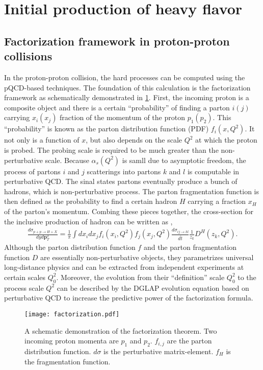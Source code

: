 \section{Initial production of heavy flavor}
\label{section:hard}
\subsection{Factorization framework in proton-proton collisions}
In the proton-proton collision, the hard processes can be computed using the pQCD-based techniques.
The foundation of this calculation is the factorization framework as schematically demonstrated in \ref{fig:factorization}.
First, the incoming proton is a composite object and there is a certain ``probability'' of finding a parton $i(j)$ carrying $x_i(x_j)$ fraction of the momentum of the proton $p_1(p_2)$.
This ``probability'' is known as the parton distribution function (PDF) $f_i(x, Q^2)$.
It not only is a function of $x$, but also depends on the scale $Q^2$ at which the proton is probed.
The probing scale is required to be much greater than the non-perturbative scale.
Because $\alpha_s(Q^2)$ is samll due to asymptotic freedom, the process of partons $i$ and $j$ scatterings into partons $k$ and $l$ is computable in perturbative QCD.
The sinal states partons eventually produce a bunch of hadrons, which is non-perturbative process.
The parton fragmentation function is then defined as the probability to find a certain hadron $H$ carrying a fraction $x_H$ of the parton's momentum.
Combing these pieces together, the cross-section for the inclusive production of hadron can be written as \cite{Field:1989uq},
\begin{eqnarray}
\frac{d\sigma_{p+p\rightarrow H+X}}{dy d\mathbf{p}_T^2} = \frac{1}{\pi}\int dx_i dx_j f_i(x_i, Q^2) f_j(x_j, Q^2) \frac{d\sigma_{ij\rightarrow kl}}{d\hat{t}} \frac{1}{z_k}D^H(z_k, Q^2).
\end{eqnarray}
Although the parton distribution function $f$ and the parton fragmentation function $D$ are essentially non-perturbative objects, they parametrizes universal long-distance physics and can be extracted from independent experiments at certain scales $Q_0^2$.
Moreover, the evolution from their ``definition'' scale $Q_0^2$ to the process scale $Q^2$ can be described by the DGLAP evolution equation \cite{Gribov:1972ri,Altarelli:1977zs,Dokshitzer:1977sg} based on perturbative QCD to increase the predictive power of the factorization formula.

\begin{figure}
\centering
\texttt{[image: factorization.pdf]}
\caption{A schematic demonstration of the factorization theorem. Two incoming proton momenta are $p_1$ and $p_2$. $f_{i,j}$ are the parton distribution function. $d\sigma$ is the perturbative matrix-element. $f_H$ is the fragmentation function.}
\label{fig:factorization}
\end{figure}


